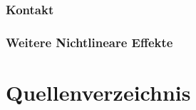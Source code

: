 \documentclass[letterpaper,10pt,german]{jupyterBook}
\begin{document}
\section{Kontakt}
\label{\detokenize{chapters/chapter5/Kontakt:kontakt}}\label{\detokenize{chapters/chapter5/Kontakt::doc}}
\sphinxstepscope


\section{Weitere Nichtlineare Effekte}
\label{\detokenize{chapters/chapter5/WeitereNichtlineareEffekte:weitere-nichtlineare-effekte}}\label{\detokenize{chapters/chapter5/WeitereNichtlineareEffekte::doc}}
\sphinxstepscope


\part{Quellenverzeichnis}

\sphinxstepscope
\end{document}
